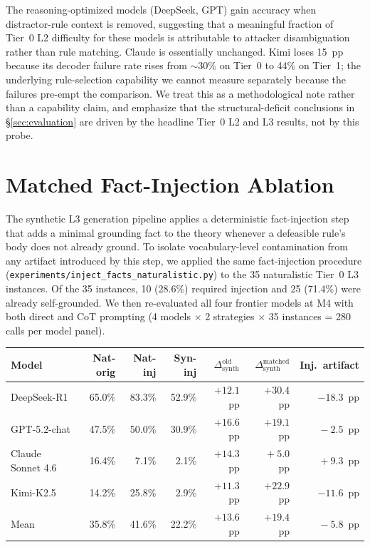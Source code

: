 \documentclass{article}
\theoremstyle{definition}
\begin{document}
The reasoning-optimized models (DeepSeek, GPT) gain accuracy when distractor-rule context is removed, suggesting that a meaningful fraction of Tier~0 L2 difficulty for these models is attributable to attacker disambiguation rather than rule matching. Claude is essentially unchanged. Kimi loses 15~pp because its decoder failure rate rises from $\sim 30\%$ on Tier~0 to 44\% on Tier~1; the underlying rule-selection capability we cannot measure separately because the failures pre-empt the comparison. We treat this as a methodological note rather than a capability claim, and emphasize that the structural-deficit conclusions in \S\ref{sec:evaluation} are driven by the headline Tier~0 L2 and L3 results, not by this probe.


\section{Matched Fact-Injection Ablation}\label{app:factinj}

The synthetic L3 generation pipeline applies a deterministic fact-injection step that adds a minimal grounding fact to the theory whenever a defeasible rule's body does not already ground. To isolate vocabulary-level contamination from any artifact introduced by this step, we applied the same fact-injection procedure (\texttt{experiments/inject\_facts\_naturalistic.py}) to the 35 naturalistic Tier~0 L3 instances. Of the 35 instances, 10 (28.6\%) required injection and 25 (71.4\%) were already self-grounded. We then re-evaluated all four frontier models at M4 with both direct and CoT prompting (4 models $\times$ 2 strategies $\times$ 35 instances = 280 calls per model panel).

\begin{table}[h]
\centering
\small
\begin{tabular}{lrrrrrr}
\toprule
Model & Nat-orig & Nat-inj & Syn-inj & $\Delta_{\mathrm{synth}}^{\mathrm{old}}$ & $\Delta_{\mathrm{synth}}^{\mathrm{matched}}$ & Inj.\ artifact \\
\midrule
DeepSeek-R1        & 65.0\% & 83.3\% & 52.9\% & $+12.1$~pp & $+30.4$~pp & $-18.3$~pp \\
GPT-5.2-chat       & 47.5\% & 50.0\% & 30.9\% & $+16.6$~pp & $+19.1$~pp & $\phantom{0}-2.5$~pp \\
Claude Sonnet 4.6  & 16.4\% & \phantom{0}7.1\% & \phantom{0}2.1\% & $+14.3$~pp & $\phantom{0}+5.0$~pp & $\phantom{0}+9.3$~pp \\
Kimi-K2.5          & 14.2\% & 25.8\% & \phantom{0}2.9\% & $+11.3$~pp & $+22.9$~pp & $-11.6$~pp \\
\midrule
Mean               & 35.8\% & 41.6\% & 22.2\% & $+13.6$~pp & $+19.4$~pp & $\phantom{0}-5.8$~pp \\
\bottomrule
\end{tabular}
\end{table}
\end{document}
